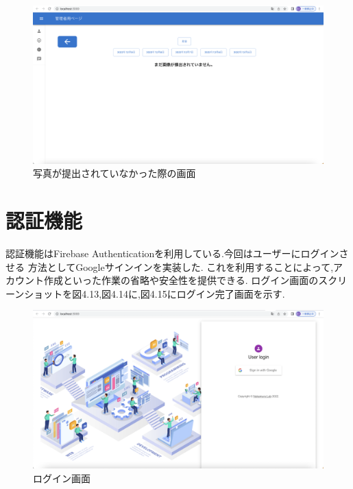 \begin{figure}[!h]
	\begin{center}
			\includegraphics[scale=0.3, clip]{./img/sample11.png}
			\caption{写真が提出されていなかった際の画面}
			\label{fig:図の名前}
	\end{center}
\end{figure}

\clearpage

\section{認証機能}

認証機能はFirebase Authenticationを利用している.今回はユーザーにログインさせる
方法としてGoogleサインインを実装した.
これを利用することによって,アカウント作成といった作業の省略や安全性を提供できる.
ログイン画面のスクリーンショットを図4.13,図4.14に,図4.15にログイン完了画面を示す.
\\

\vspace{17mm}

\begin{figure}[!h]
\begin{center}
  \includegraphics[scale=0.3, clip]{./img/sample13.png}
  \caption{ログイン画面}
  \label{fig:図の名前}
\end{center}
\end{figure}

